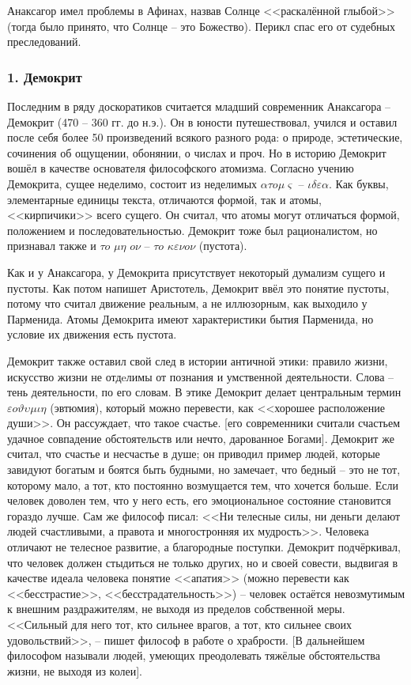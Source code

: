 \documentclass[a4paper, 12pt]{article} %
\begin{document}
Анаксагор имел проблемы в Афинах, назвав Солнце <<раскалённой глыбой>> (тогда было принято, что Солнце -- это Божество). Перикл спас его от судебных преследований. 

\subsubsection*{1. Демокрит}
Последним в ряду доскоратиков считается младший современник Анаксагора -- Демокрит (470 -- 360 гг. до н.э.). Он в юности путешествовал, учился и оставил после себя более 50 произведений всякого разного рода: о природе, эстетические, сочинения об ощущении, обонянии, о числах и проч. Но в историю Демокрит вошёл в качестве основателя философского атомизма. Согласно учению Демокрита, сущее неделимо, состоит из неделимых $ \alpha \tau o \mu \varsigma $ -- $ \iota \delta \varepsilon \alpha $. Как буквы, элементарные единицы текста, отличаются формой, так и атомы, <<кирпичики>> всего сущего. Он считал, что атомы могут отличаться формой, положением и последовательностью. Демокрит тоже был рационалистом, но признавал также и $\tau o $ $\mu \eta $ $o \nu$ -- $\tau o $ $\kappa \varepsilon \nu o \nu$ (пустота).

Как и у Анаксагора, у Демокрита присутствует некоторый думализм сущего и пустоты. Как потом напишет Аристотель, Демокрит ввёл это понятие пустоты, потому что считал движение реальным,  а не иллюзорным, как выходило у Парменида. Атомы Демокрита имеют характеристики бытия Парменида, но условие их движения есть пустота.

Демокрит также оставил свой след в истории античной этики: правило жизни, искусство жизни не отдeлимы от познания и умственной деятельности. Слова -- тень деятельности, по его словам. В этике Демокрит делает центральным термин $\varepsilon o \vartheta \upsilon \mu \iota \eta$ (эвтюмия), который можно перевести, как <<хорошее расположение души>>. Он рассуждает, что такое счастье. [его современники считали счастьем удачное совпадение обстоятельств или нечто, дарованное Богами]. Демокрит же считал, что счастье и несчастье в душе; он приводил пример людей, которые завидуют богатым и боятся быть будными, но замечает, что бедный -- это не тот, которому мало, а тот, кто постоянно возмущается тем, что хочется больше. Если человек доволен тем, что у него есть, его эмоциональное состояние становится гораздо лучше. Сам же философ писал: <<Ни телесные силы, ни деньги делают людей счастливыми, а правота и многостронняя их мудрость>>. Человека отличают не телесное развитие, а благородные поступки. Демокрит подчёркивал, что человек должен стыдиться не только других, но и своей совести, выдвигая в качестве идеала человека понятие <<апатия>> (можно перевести как <<бесстрастие>>, <<бесстрадательность>>) -- человек остаётся невозмутимым к внешним раздражителям, не выходя из пределов собственной меры. <<Сильный для него тот, кто сильнее врагов, а тот, кто сильнее своих удовольствий>>, -- пишет философ в работе о храбрости. [В дальнейшем философом называли людей, умеющих преодолевать тяжёлые обстоятельства жизни, не выходя из колеи].
\end{document}
